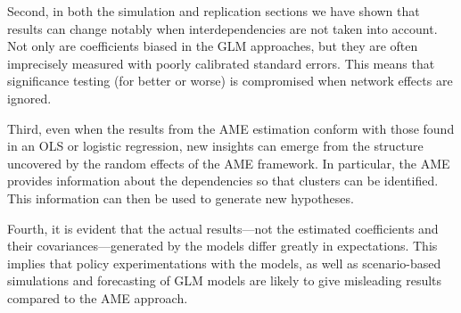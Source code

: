 Second, in both the simulation  and replication sections  we have shown that results can change notably when interdependencies are not taken into account. Not only are coefficients biased in the GLM approaches, but they are often imprecisely measured with poorly calibrated standard errors.  This means that significance testing (for better or worse) is compromised when network effects are ignored.

Third, even when the results from the AME estimation conform with those found in an OLS or logistic regression, new insights can emerge from the structure uncovered by the random effects of the AME framework. In particular, the AME provides information about the dependencies so that clusters can be identified.  This information can then be used to generate new hypotheses.

Fourth, it is evident that the actual results---not the estimated coefficients and their covariances---generated by the models differ greatly in expectations.  This implies that policy experimentations with the models, as well as scenario-based simulations and forecasting of GLM models are likely to give misleading results compared to the AME approach.
